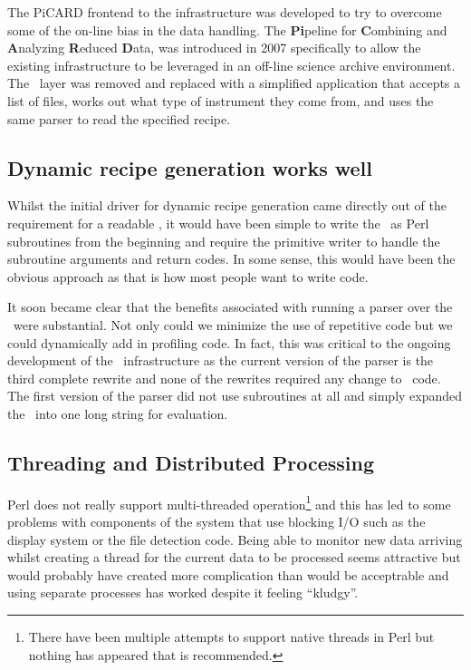 \documentclass[final,authoryear,5p,times,twocolumn]{elsarticle}
\begin{document}
The PiCARD \citep{SUN265} frontend to the infrastructure was developed
to try to overcome some of the on-line bias in the data handling. The
\textbf{Pi}peline for \textbf{C}ombining and \textbf{A}nalyzing
\textbf{R}educed \textbf{D}ata, was introduced in 2007
\citep{2008ASPC..394..565J} specifically to allow the existing
infrastructure to be leveraged in an off-line science archive
environment. The \oracdr\ layer was removed and replaced with a
simplified application that accepts a list of files, works out what
type of instrument they come from, and uses the same parser to read
the specified recipe.

\subsection{Dynamic recipe generation works well}

Whilst the initial driver for dynamic recipe generation came directly
out of the requirement for a readable \recipe, it would have been
simple to write the \primitives\ as Perl subroutines from the
beginning and require the primitive writer to handle the subroutine
arguments and return codes. In some sense, this would have been the
obvious approach as that is how most people want to write code.

It soon became clear that the benefits associated
with running a parser over the \primitives\ were substantial. Not only
could we minimize the use of repetitive code but we could dynamically
add in profiling code. In fact, this was critical to the ongoing
development of the \oracdr\ infrastructure as the current version of
the parser is the third complete rewrite and none of the rewrites
required any change to \primitive\ code. The first version of the
parser did not use subroutines at all and simply expanded the \recipe\
into one long string for evaluation.

\subsection{Threading and Distributed Processing}

Perl does not really support multi-threaded
operation\footnote{There have been multiple attempts to support native
  threads in Perl but nothing has appeared that is recommended.}
and this has led to some problems with components of the system that
use blocking I/O such as the display system or the file detection
code. Being able to monitor new data arriving whilst creating a thread for the
current data to be processed seems attractive but would probably have
created more complication than would be acceptrable and using separate
processes has worked despite it feeling ``kludgy''.
\end{document}
